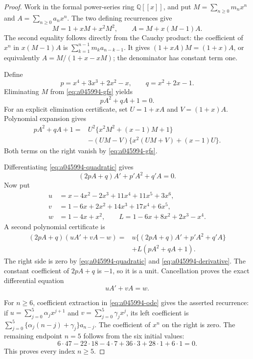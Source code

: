 \begin{proof}
Work in the formal power-series ring $\mathbb Q[[x]]$, and put
$M=\sum_{n\ge0}m_nx^n$ and $A=\sum_{n\ge0}a_nx^n$.
The two defining recurrences give
\begin{equation}\label{eq:a045994-gfs}
 M=1+xM+x^2M^2,\qquad A=M+x(M-1)A.
\end{equation}
The second equality follows directly from the Cauchy product:
the coefficient of $x^n$ in $x(M-1)A$ is
$\sum_{k=1}^{n-1}m_ka_{n-k-1}$.
It gives $(1+xA)M=(1+x)A$, or equivalently
$A=M/(1+x-xM)$; the denominator has constant term one.

Define
\[
 p=x^4+3x^3+2x^2-x,\qquad q=x^2+2x-1.
\]
Eliminating $M$ from \eqref{eq:a045994-gfs} yields
\begin{equation}\label{eq:a045994-quadratic}
 pA^2+qA+1=0.
\end{equation}
For an explicit elimination certificate, set $U=1+xA$ and
$V=(1+x)A$. Polynomial expansion gives
\[
\begin{aligned}
pA^2+qA+1={}&
 U^2\{x^2M^2+(x-1)M+1\}\\
 &-(UM-V)\{x^2(UM+V)+(x-1)U\}.
\end{aligned}
\]
Both terms on the right vanish by \eqref{eq:a045994-gfs}.

Differentiating \eqref{eq:a045994-quadratic} gives
\begin{equation}\label{eq:a045994-derivative}
 (2pA+q)A'+p'A^2+q'A=0.
\end{equation}
Now put
\[
\begin{aligned}
u&=x-4x^2-2x^3+11x^4+11x^5+3x^6,\\
v&=1-6x+2x^2+14x^3+17x^4+6x^5,\\
w&=1-4x+x^2,\qquad
L=1-6x+8x^2+2x^3-x^4.
\end{aligned}
\]
A second polynomial certificate is
\[
\begin{aligned}
(2pA+q)(uA'+vA-w)
={}&u\{(2pA+q)A'+p'A^2+q'A\}\\
&+L(pA^2+qA+1).
\end{aligned}
\]
The right side is zero by \eqref{eq:a045994-quadratic} and
\eqref{eq:a045994-derivative}. The constant coefficient of
$2pA+q$ is $-1$, so it is a unit. Cancellation proves the exact
differential equation
\begin{equation}\label{eq:a045994-ode}
 uA'+vA=w.
\end{equation}

For $n\ge6$, coefficient extraction in
\eqref{eq:a045994-ode} gives the asserted recurrence: if
$u=\sum_{j=0}^{5}\alpha_jx^{j+1}$ and
$v=\sum_{j=0}^{5}\gamma_jx^j$, its left coefficient is
$\sum_{j=0}^{5}\{\alpha_j(n-j)+\gamma_j\}a_{n-j}$.
The coefficient of $x^n$ on the right is zero.
The remaining endpoint $n=5$ follows from the six initial values:
\[
6\cdot47-22\cdot18-4\cdot7+36\cdot3+28\cdot1+6\cdot1=0.
\]
This proves every index $n\ge5$.
\end{proof}


